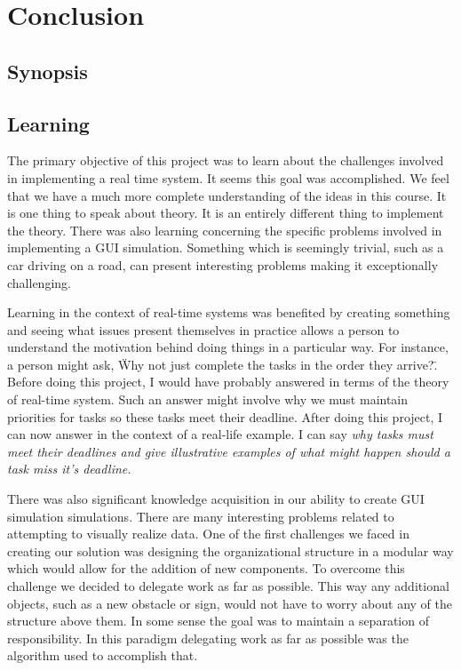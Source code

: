 \documentclass{article} %
\begin{document}
\section{Conclusion}
\subsection{Synopsis}

\subsection{Learning}
The primary objective of this project was to learn about the challenges involved in implementing a real time system.
It seems this goal was accomplished. We feel that we have a much more complete understanding of the ideas in this course.
It is one thing to speak about theory. It is an entirely different thing to implement the theory.
There was also learning concerning the specific problems involved in implementing a GUI simulation.
Something which is seemingly trivial, such as a car driving on a road, can present interesting problems making it exceptionally challenging.

Learning in the context of real-time systems was benefited by
creating something and seeing what issues present themselves in practice allows a person to understand the motivation behind doing things in a particular way.
For instance, a person might ask, \"Why not just complete the tasks in the order they arrive?\". Before doing this project, I would have probably answered in terms of the theory of real-time system.
Such an answer might involve why we must maintain priorities for tasks so these tasks meet their deadline.
After doing this project, I can now answer in the context of a real-life example. I can say
\it why \normalfont
tasks must meet their deadlines and give illustrative examples of what might happen should a task miss it's deadline.


There was also significant knowledge acquisition in our ability to create GUI simulation simulations.
There are many interesting problems related to attempting to visually realize data.
One of the first challenges we faced in creating our solution was designing the organizational structure in a modular way which would allow for the addition of new components.
To overcome this challenge we decided to delegate work as far as possible.
This way any additional objects, such as a new obstacle or sign, would not have to worry about any of the structure above them.
In some sense the goal was to maintain a separation of responsibility. In this paradigm delegating work as far as possible was the algorithm used to accomplish that.
\end{document}
